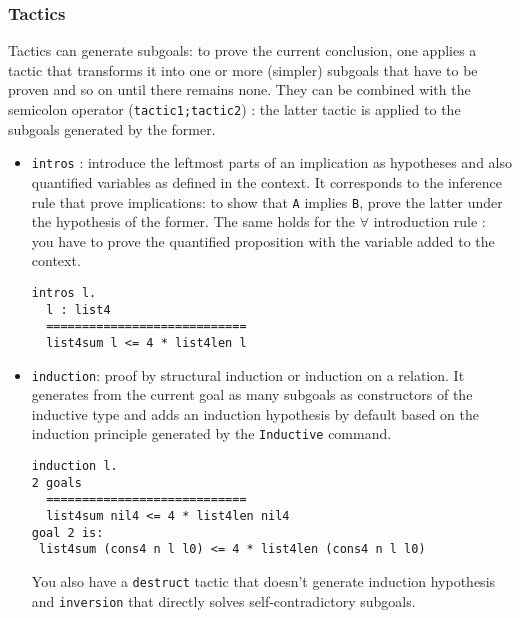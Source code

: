 \documentclass{article}
\begin{document}
        \subsubsection{Tactics}\label{Tactics}
        Tactics can generate subgoals: to prove the current conclusion, one applies a tactic that transforms it into one or more (simpler) subgoals that have to be proven and so on until there remains none. They can be combined with the semicolon operator (\texttt{tactic1;tactic2}) : the latter tactic is applied to the subgoals generated by the former.
        \begin{itemize}
            \item \texttt{intros} : introduce the leftmost parts of an implication as hypotheses and also quantified variables as defined in the context. It corresponds to the inference rule that prove implications: to show that \texttt{A} implies \texttt{B}, prove the latter under the hypothesis of the former. The same holds for the $\forall$ introduction rule : you have to prove the quantified proposition with the variable added to the context. 
            \begin{verbatim}intros l.
  l : list4
  ============================
  list4sum l <= 4 * list4len l\end{verbatim}
            \item \texttt{induction}: proof by structural induction or induction on a relation. It generates from the current goal as many subgoals as constructors of the inductive type and adds an induction hypothesis by default based on the induction principle generated by the \texttt{Inductive} command.
            \begin{verbatim}induction l.
2 goals
  ============================
  list4sum nil4 <= 4 * list4len nil4
goal 2 is:
 list4sum (cons4 n l l0) <= 4 * list4len (cons4 n l l0)\end{verbatim}
            You also have a \texttt{destruct} tactic that doesn't generate induction hypothesis and \texttt{inversion} that directly solves self-contradictory subgoals.
            

\end{itemize}
\end{document}
